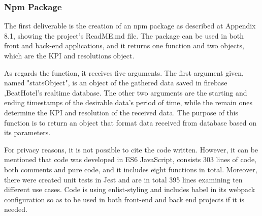 \subsubsection{Npm Package}
The first deliverable is the creation of an npm package as described at Appendix 8.1, showing the project's ReadME.md file. The package can be used in both front and back-end applications, and it returns one function and two objects, which are the KPI and resolutions object. \par 
As regards the function, it receives five arguments. The first argument given, named "statsObject", is an object of the gathered data saved in firebase ,BeatHotel's realtime database. The other two arguments are the starting and ending timestamps of the desirable data's period of time, while the remain ones determine the KPI and resolution of the received data. The purpose of this function is to return an object that format data received from database based on its parameters. \par
For privacy reasons, it is not possible to cite the code written. However, it can be mentioned that code was developed in ES6 JavaScript, consists 303 lines of code, both comments and pure code, and it includes eight functions in total. Moreover, there were created unit tests in Jest and are in total 395 lines examining ten different use cases. Code is using enlist-styling and includes babel in its webpack configuration so as to be used in both front-end and back end projects if it is needed. \par

